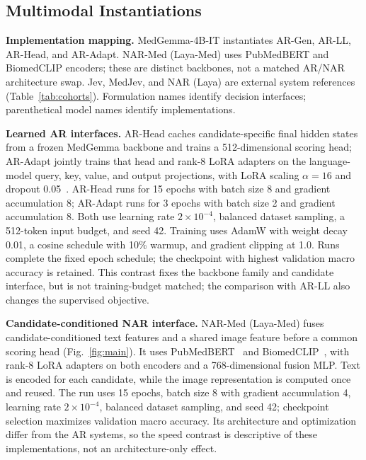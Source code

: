 \subsection{Multimodal Instantiations}
\textbf{Implementation mapping.} MedGemma-4B-IT instantiates AR-Gen, AR-LL, AR-Head, and AR-Adapt. NAR-Med (Laya-Med) uses PubMedBERT and BiomedCLIP encoders; these are distinct backbones, not a matched AR/NAR architecture swap. Jev, MedJev, and NAR (Laya) are external system references (Table~\ref{tab:cohorts}). Formulation names identify decision interfaces; parenthetical model names identify implementations.

\textbf{Learned AR interfaces.} AR-Head caches candidate-specific final hidden states from a frozen MedGemma backbone and trains a 512-dimensional scoring head; AR-Adapt jointly trains that head and rank-8 LoRA adapters on the language-model query, key, value, and output projections, with LoRA scaling $\alpha=16$ and dropout 0.05~\citep{hu2022lora}. AR-Head runs for 15 epochs with batch size 8 and gradient accumulation 8; AR-Adapt runs for 3 epochs with batch size 2 and gradient accumulation 8. Both use learning rate $2\times10^{-4}$, balanced dataset sampling, a 512-token input budget, and seed 42. Training uses AdamW with weight decay 0.01, a cosine schedule with 10\% warmup, and gradient clipping at 1.0. Runs complete the fixed epoch schedule; the checkpoint with highest validation macro accuracy is retained. This contrast fixes the backbone family and candidate interface, but is not training-budget matched; the comparison with AR-LL also changes the supervised objective.

\textbf{Candidate-conditioned NAR interface.} NAR-Med (Laya-Med) fuses candidate-conditioned text features and a shared image feature before a common scoring head (Fig.~\ref{fig:main}). It uses PubMedBERT~\citep{gu2008pubmedbert} and BiomedCLIP~\citep{zhang2023biomedclip}, with rank-8 LoRA adapters on both encoders and a 768-dimensional fusion MLP. Text is encoded for each candidate, while the image representation is computed once and reused. The run uses 15 epochs, batch size 8 with gradient accumulation 4, learning rate $2\times10^{-4}$, balanced dataset sampling, and seed 42; checkpoint selection maximizes validation macro accuracy. Its architecture and optimization differ from the AR systems, so the speed contrast is descriptive of these implementations, not an architecture-only effect.

